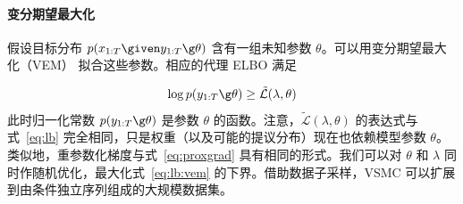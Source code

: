 \paragraph{变分期望最大化}
假设目标分布 $p(x_{1:T}\given y_{1:T}\g\theta)$ 含有一组未知参数 $\theta$。可以用变分期望最大化（VEM）\citep{Beal2003} 拟合这些参数。相应的代理 ELBO 满足

\begin{align}
\log p(y_{1:T}\g\theta) \geq
\tilde{\mathcal{L}}(\lambda,\theta)\label{eq:lb:vem}
\end{align}
此时归一化常数 $p(y_{1:T}\g\theta)$ 是参数 $\theta$ 的函数。注意，$\tilde{\mathcal L}(\lambda,\theta)$ 的表达式与式~\eqref{eq:lb} 完全相同，只是权重（以及可能的提议分布）现在也依赖模型参数 $\theta$。类似地，重参数化梯度与式~\eqref{eq:proxgrad} 具有相同的形式。我们可以对 $\theta$ 和 $\lambda$ 同时作随机优化，最大化式~\eqref{eq:lb:vem} 的下界。借助数据子采样，VSMC 可以扩展到由条件独立序列组成的大规模数据集\citep{Hoffman2013,titsias2014doubly}。

